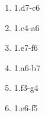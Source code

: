 \begin{enumerate}
\setcounter{enumi}{\value{d_counter}}
\item 1.\bishop{}d7-c6\mate{}
\item 1.\bishop{}c4-a6\mate{}
\item 1.\bishop{}e7-f6\mate{}
\item 1.\bishop{}a6-b7\mate{}
\item 1.\bishop{}f3-g4\mate{}
\item 1.\bishop{}e6-f5\mate{}
\setcounter{d_counter}{\value{enumi}}
\end{enumerate}